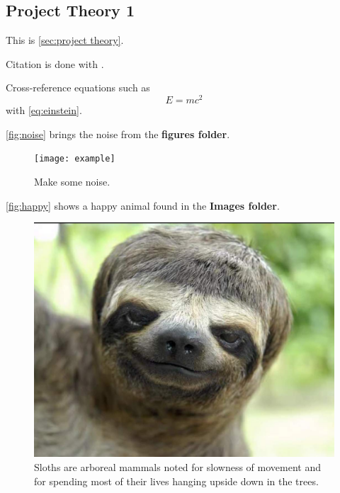 \subsection{Project Theory 1}\label{sec:project theory}
This is \autoref{sec:project theory}.

Citation is done with  \cite[p.~100]{Sakurai}.

Cross-reference equations such as
\begin{equation}\label{eq:einstein}
    E = m c^2
\end{equation}
with \cref{eq:einstein}.

\autoref{fig:noise} brings the noise from the \textbf{figures folder}. 
\begin{figure}[H]
\begin{center}\texttt{[image: example]} 
\end{center}
\caption{Make some noise.}
\label{fig:noise}
\end{figure}

\autoref{fig:happy} shows a happy animal found in the \textbf{Images folder}. 
\begin{figure}[H]
\begin{center}\includegraphics[scale=0.5]{./Images/Funny-Animal-Face} 
\end{center}
\caption{Sloths are arboreal mammals noted for slowness of movement and for spending most of their lives hanging upside down in the trees.}
\label{fig:happy}
\end{figure}

